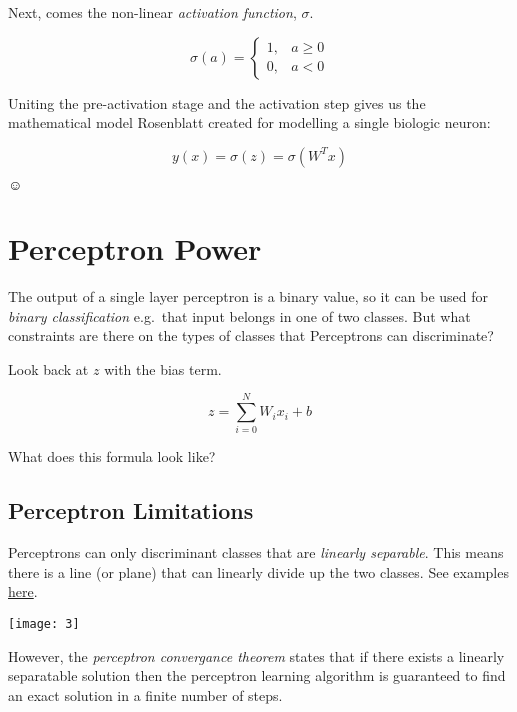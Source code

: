 \documentclass[letterpaper,12pt]{article}
\begin{document}
Next, comes the non-linear \emph{activation function}, $\sigma$.

\[
    \sigma(a) =
    \begin{cases}
        1, & a \ge 0\\
        0, & a < 0
    \end{cases}
\]

Uniting the pre-activation stage and the activation step gives us the
mathematical model Rosenblatt created for modelling a single biologic neuron:

\[
    y(x) = \sigma(z) =  \sigma(W^{T}x)
\]

$\smiley$

\section{Perceptron Power}

The output of a single layer perceptron is a binary value, so it can be used
for \emph{binary classification} e.g.\ that input belongs in one of two classes.
But what constraints are there on the types of classes that Perceptrons can
discriminate?

Look back at $z$ with the bias term.

\[
    z = \sum_{i=0}^{N} W_i x_i + b
\]

What does this formula look like?

\subsection{Perceptron Limitations}

Perceptrons can only discriminant classes that are \emph{linearly separable}.
This means there is a line (or plane) that can linearly divide up the two
classes. See examples \href{https://en.wikipedia.org/wiki/Linear_separability}{here}.

\texttt{[image: 3]}

However, the \emph{perceptron convergance theorem} states that if there exists
a linearly separatable solution then the perceptron learning algorithm is
guaranteed to find an exact solution in a finite number of steps.
\end{document}
